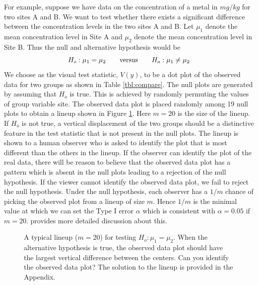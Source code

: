 For example, suppose we have data on the concentration of a metal in $mg/kg$ for two sites A and B.
We want to test whether there exists a significant difference between the concentration levels in the two sites A and B. Let $\mu_1$ denote the mean concentration level in Site A and $\mu_2$ denote the mean concentration level in Site B. Thus the null and alternative hypothesis would be
\[
H_o: \mu_1 = \mu_2 \qquad \hbox{versus} \qquad H_a: \mu_1 \ne \mu_2
\]
We choose as the visual test statistic, $V(y)$, to be a dot plot of the observed data for two groups as shown in Table \ref{tbl:compare}. The null plots are generated by assuming that $H_o$ is true. This is achieved by randomly permuting the values of group variable site. The observed data plot is placed randomly among 19  null plots to obtain a lineup shown in Figure \ref{lineup}. Here $m = 20$ is the size of the lineup. If $H_o$ is not true, a vertical displacement of the two groups should be a distinctive feature in the test statistic that is not present in the null plots. The lineup is shown to a human observer who is asked to identify the plot that is most different than the others in the lineup. If the observer can identify the plot of the real data, there will be reason to believe that the observed data plot has a pattern which is absent in the null plots leading to a rejection of the null hypothesis. If the viewer cannot identify the observed data plot, we fail to reject the null hypothesis. Under the null hypothesis, each observer has a $1/m$ chance of picking the observed plot from a lineup of size $m$. Hence $1/m$ is the minimal value at which we can set the Type I error $\alpha$ which is consistent with $\alpha = 0.05$ if $m = 20$.  \cite{majumder:2011} provides more detailed discussion about this.
\begin{figure}[hbtp]
   \centering
      \caption{A typical lineup  ($m = 20$) for testing $H_o: \mu_1 =  \mu_2$. 
      When the alternative hypothesis is true, the observed data plot should have the largest vertical difference between the centers. Can you identify the observed data plot? The solution to the lineup is provided in the Appendix.}
      \label{lineup}
\end{figure}

